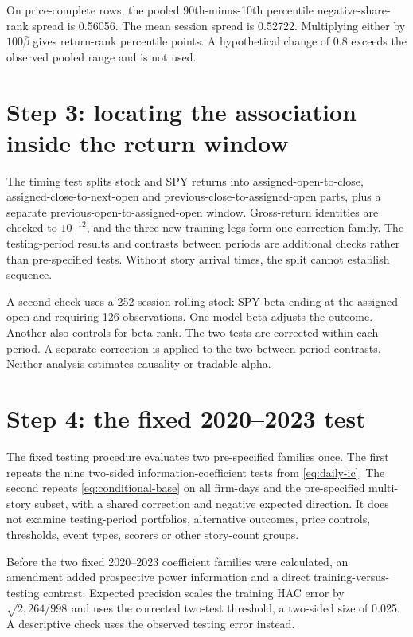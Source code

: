 On price-complete rows, the pooled 90th-minus-10th percentile negative-share-rank
spread is 0.56056. The mean session spread is 0.52722. Multiplying either by
$100\bar\beta$ gives return-rank percentile points. A hypothetical change of
0.8 exceeds the observed pooled range and is not used.

\section{Step 3: locating the association inside the return window}

The timing test splits stock and SPY returns into assigned-open-to-close,
assigned-close-to-next-open and previous-close-to-assigned-open parts, plus a
separate previous-open-to-assigned-open window. Gross-return identities are
checked to $10^{-12}$, and the three new training legs form one correction
family. The testing-period results and contrasts between periods are additional
checks rather than pre-specified tests. Without story arrival times, the split
cannot establish sequence.

A second check uses a 252-session rolling stock-SPY beta ending at the assigned
open and requiring 126 observations. One model beta-adjusts the outcome. Another
also controls for beta rank. The two tests are corrected within each period. A
separate correction is applied to the two between-period contrasts. Neither
analysis estimates causality or tradable alpha.

\section{Step 4: the fixed 2020--2023 test}

The fixed testing procedure evaluates two pre-specified families once. The first
repeats the nine two-sided information-coefficient tests from
\cref{eq:daily-ic}. The second repeats \cref{eq:conditional-base} on all firm-days
and the pre-specified multi-story subset, with a shared correction and negative
expected direction. It does not examine testing-period portfolios, alternative
outcomes, price controls, thresholds, event types, scorers or other story-count
groups.

Before the two fixed 2020--2023 coefficient families were calculated, an
amendment added prospective power information and a direct
training-versus-testing contrast.
Expected precision scales the training HAC error by $\sqrt{2,264/998}$ and uses
the corrected two-test threshold, a two-sided size of 0.025. A descriptive check
uses the observed testing error instead.

